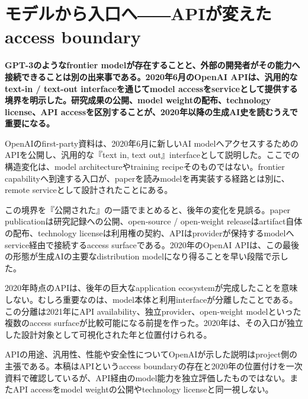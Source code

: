 \section{モデルから入口へ――APIが変えたaccess boundary}
\label{pkg:access-api}
\noindent\textbf{GPT-3のようなfrontier modelが存在することと、外部の開発者がその能力へ接続できることは別の出来事である。2020年6月のOpenAI APIは、汎用的なtext-in / text-out interfaceを通じてmodel accessをserviceとして提供する境界を明示した。研究成果の公開、model weightの配布、technology license、API accessを区別することが、2020年以降の生成AI史を読むうえで重要になる。}\autocite{src-3b6a4c260e20}

OpenAIのfirst-party資料は、2020年6月に新しいAI modelへアクセスするためのAPIを公開し、汎用的な『text in, text out』interfaceとして説明した。ここでの構造変化は、model architectureやtraining recipeそのものではない。frontier capabilityへ到達する入口が、paperを読みmodelを再実装する経路とは別に、remote serviceとして設計されたことにある。\autocite{src-3b6a4c260e20}


この境界を『公開された』の一語でまとめると、後年の変化を見誤る。paper publicationは研究記録への公開、open-source / open-weight releaseはartifact自体の配布、technology licenseは利用権の契約、APIはproviderが保持するmodelへservice経由で接続するaccess surfaceである。2020年のOpenAI APIは、この最後の形態が生成AIの主要なdistribution modelになり得ることを早い段階で示した。\autocite{src-3b6a4c260e20}


2020年時点のAPIは、後年の巨大なapplication ecosystemが完成したことを意味しない。むしろ重要なのは、model本体と利用interfaceが分離したことである。この分離は2021年にAPI availability、独立provider、open-weight modelといった複数のaccess surfaceが比較可能になる前提を作った。2020年は、その入口が独立した設計対象として可視化された年と位置付けられる。\autocite{src-3b6a4c260e20}


\begin{claimboundary}
APIの用途、汎用性、性能や安全性についてOpenAIが示した説明はproject側の主張である。本稿はAPIというaccess boundaryの存在と2020年の位置付けを一次資料で確認しているが、API経由のmodel能力を独立評価したものではない。またAPI accessをmodel weightの公開やtechnology licenseと同一視しない。\autocite{src-3b6a4c260e20}
\end{claimboundary}
